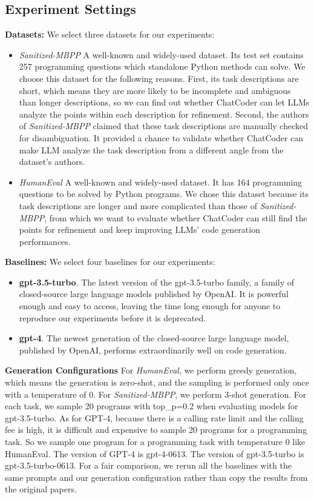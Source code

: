 \documentclass[sigconf]{acmart}
\begin{document}
\subsection{Experiment Settings}
\textbf{Datasets:} We select three datasets for our experiments:
\begin{itemize}
    \item \textit{Sanitized-MBPP} A well-known and widely-used dataset\cite{mbpp}. Its test set contains 257 programming questions which standalone Python methods can solve. We choose this dataset for the following reasons. First, its task descriptions are short, which means they are more likely to be incomplete and ambiguous than longer descriptions, so we can find out whether ChatCoder can let LLMs analyze the points within each description for refinement. Second, the authors of \textit{Sanitized-MBPP} claimed that these task descriptions are manually checked for disambiguation. It provided a chance to validate whether ChatCoder can make LLM analyze the task description from a different angle from the dataset's authors.
    \item \textit{HumanEval} A well-known and widely-used dataset\cite{codex_humaneval}. It has 164 programming questions to be solved by Python programs. We chose this dataset because its task descriptions are longer and more complicated than those of \textit{Sanitized-MBPP}, from which we want to evaluate whether ChatCoder can still find the points for refinement and keep improving LLMs' code generation performances.
\end{itemize}

\textbf{Baselines: } We select four baselines for our experiments:
\begin{itemize}
    \item \textbf{gpt-3.5-turbo}. The latest version of the gpt-3.5-turbo family, a family of closed-source large language models published by OpenAI. It is powerful enough and easy to access, leaving the time long enough for anyone to reproduce our experiments before it is deprecated. 
    \item \textbf{gpt-4}. The newest generation of the closed-source large language model, published by OpenAI, performs extraordinarily well on code generation.
\end{itemize}

\textbf{Generation Configurations} For \textit{HumanEval}, we perform greedy generation, which means the generation is zero-shot, and the sampling is performed only once with a temperature of 0. For \textit{Sanitized-MBPP}, we perform 3-shot generation. For each task, we sample 20 programs with top\_p=0.2 when evaluating models for gpt-3.5-turbo. As for GPT-4, because there is a calling rate limit and the calling fee is high, it is difficult and expensive to sample 20 programs for a programming task. So we sample one program for a programming task with temperature 0 like HumanEval. The version of GPT-4 is gpt-4-0613. The version of gpt-3.5-turbo is gpt-3.5-turbo-0613. For a fair comparison, we rerun all the baselines with the same prompts and our generation configuration rather than copy the results from the original papers.
\end{document}
